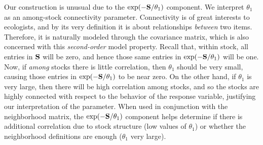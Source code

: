 \documentclass[11pt, titlepage]{article}\usepackage[]{graphicx}\usepackage[]{color}
\begin{document}
Our construction is unusual due to the $\exp(-\mathbf{S}/\theta_1)$ component.  We interpret $\theta_1$ as an among-stock connectivity parameter.  Connectivity is of great interests to ecologists, and by its very definition it is about relationships \emph{between} two items.  Therefore, it is naturally modeled through the covariance matrix, which is also concerned with this \emph{second-order} model property.  Recall that, within stock, all entries in $\mathbf{S}$ will be zero, and hence those same entries in $\exp(-\mathbf{S}/\theta_1)$ will be one.  Now, if \emph{among} stocks there is little correlation, then $\theta_1$ should be very small, causing those entries in $\exp(-\mathbf{S}/\theta_1)$ to be near zero.  On the  other hand, if $\theta_1$ is very large, then there will be high correlation among stocks, and so the stocks are highly connected with respect to the behavior of the response variable, justifying our interpretation of the parameter.  When used in conjunction with the neighborhood matrix, the $\exp(-\mathbf{S}/\theta_1)$ component helps determine if there is additional correlation due to stock structure (low values of $\theta_1$) or whether the neighborhood definitions are enough ($\theta_1$ very large).
\end{document}
